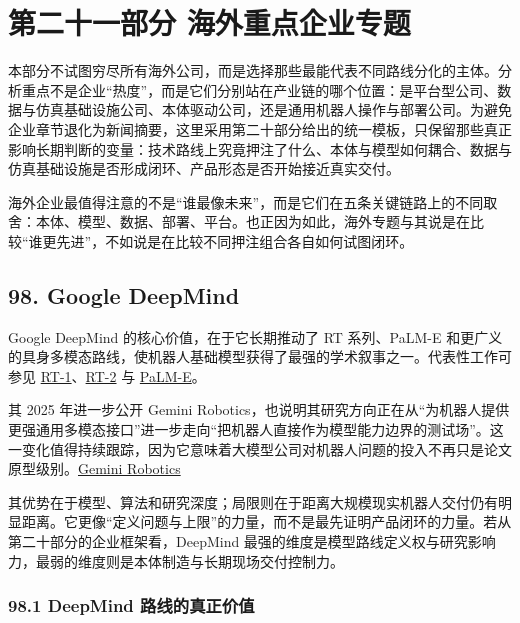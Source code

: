 
\part*{第二十一部分 海外重点企业专题}

本部分不试图穷尽所有海外公司，而是选择那些最能代表不同路线分化的主体。分析重点不是企业“热度”，而是它们分别站在产业链的哪个位置：是平台型公司、数据与仿真基础设施公司、本体驱动公司，还是通用机器人操作与部署公司。为避免企业章节退化为新闻摘要，这里采用第二十部分给出的统一模板，只保留那些真正影响长期判断的变量：技术路线上究竟押注了什么、本体与模型如何耦合、数据与仿真基础设施是否形成闭环、产品形态是否开始接近真实交付。

海外企业最值得注意的不是“谁最像未来”，而是它们在五条关键链路上的不同取舍：本体、模型、数据、部署、平台。也正因为如此，海外专题与其说是在比较“谁更先进”，不如说是在比较不同押注组合各自如何试图闭环。

\chapter*{98. Google DeepMind}

Google DeepMind 的核心价值，在于它长期推动了 RT 系列、PaLM-E 和更广义的具身多模态路线，使机器人基础模型获得了最强的学术叙事之一。代表性工作可参见 \href{https://arxiv.org/abs/2212.06817}{RT-1}、\href{https://arxiv.org/abs/2307.15818}{RT-2} 与 \href{https://arxiv.org/abs/2303.03378}{PaLM-E}。

其 2025 年进一步公开 Gemini Robotics，也说明其研究方向正在从“为机器人提供更强通用多模态接口”进一步走向“把机器人直接作为模型能力边界的测试场”。这一变化值得持续跟踪，因为它意味着大模型公司对机器人问题的投入不再只是论文原型级别。\href{https://deepmind.google/blog/gemini-robotics-brings-ai-into-the-physical-world/}{Gemini Robotics}

其优势在于模型、算法和研究深度；局限则在于距离大规模现实机器人交付仍有明显距离。它更像“定义问题与上限”的力量，而不是最先证明产品闭环的力量。若从第二十部分的企业框架看，DeepMind 最强的维度是模型路线定义权与研究影响力，最弱的维度则是本体制造与长期现场交付控制力。

\section*{98.1 DeepMind 路线的真正价值}


